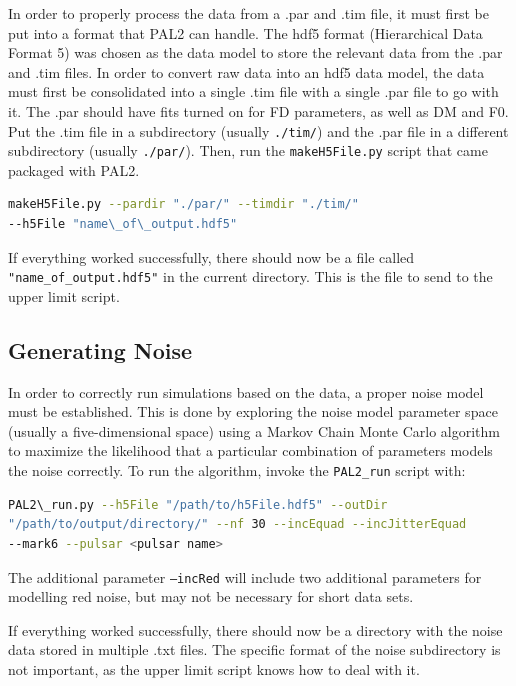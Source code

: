 \documentclass[12pt]{article}
\begin{document}
In order to properly process the data from a .par and .tim file, it must first 
be put into a format that PAL2 can handle. The hdf5 format (Hierarchical Data
Format 5) was chosen as the data model to store the relevant data from the .par
and .tim files.
In order to convert raw data into an hdf5 data model, the data must first be
consolidated into a single .tim file with a single .par file to go with it. The
.par should have fits turned on for FD parameters, as well as DM and F0.
Put the .tim file in a subdirectory (usually \texttt{./tim/}) and the .par file in a
different subdirectory (usually \texttt{./par/}). Then, run the \texttt{makeH5File.py} script that
came packaged with PAL2.
\\
\begin{lstlisting}[language=bash]
makeH5File.py --pardir "./par/" --timdir "./tim/"
--h5File "name\_of\_output.hdf5"
\end{lstlisting}

If everything worked successfully, there should now be a file called
\texttt{"name\_of\_output.hdf5"} in the current directory. This is the file to send to the
upper limit script.

\subsection{Generating Noise}

In order to correctly run simulations based on the data, a proper noise model
must be established. This is done by exploring the noise model parameter space
(usually a five-dimensional space) using a Markov Chain Monte Carlo algorithm to
maximize the likelihood that a particular combination of parameters models the
noise correctly. To run the algorithm, invoke the \texttt{PAL2\_run} script with:
\\
\begin{lstlisting}[language=bash]
PAL2\_run.py --h5File "/path/to/h5File.hdf5" --outDir
"/path/to/output/directory/" --nf 30 --incEquad --incJitterEquad
--mark6 --pulsar <pulsar name>
\end{lstlisting}

The additional parameter \texttt{--incRed} will include two additional parameters for
modelling red noise, but may not be necessary for short data sets.

If everything worked successfully, there should now be a directory with the
noise data stored in multiple .txt files. The specific format of the noise
subdirectory is not important, as the upper limit script knows how to deal with
it.
\end{document}
